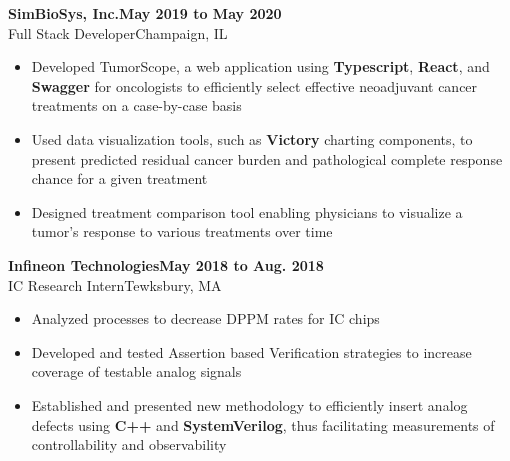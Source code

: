 \documentclass[9pt]{extarticle}
\newcommand{\experiencesubsection}[4]{
    \vspace{0.75em}\Large\textbf{#1\hfill{#4}}\\{#2}\hfill{#3}\normalsize
}
\begin{document}
\begin{minipage}[t]{.7\textwidth}
    \experiencesubsection{SimBioSys, Inc.}{Full Stack Developer}{Champaign, IL}{May 2019 to May 2020}
    \begin{itemize}
        \setlength\itemsep{1dd}
        \item Developed TumorScope, a web application using \textbf{Typescript}, \textbf{React}, and \textbf{Swagger} for oncologists to efficiently select
            effective neoadjuvant cancer treatments on a case-by-case basis
        \item Used data visualization tools, such as \textbf{Victory} charting components, to present predicted residual cancer burden and pathological
            complete response chance for a given treatment
        \item Designed treatment comparison tool enabling physicians to visualize a tumor's response to various treatments over time
    \end{itemize}

    \experiencesubsection{Infineon Technologies}{IC Research Intern}{Tewksbury, MA}{May 2018 to Aug. 2018}
    \begin{itemize}
        \setlength\itemsep{1dd}
        \item Analyzed processes to decrease DPPM rates for IC chips
        \item Developed and tested Assertion based Verification strategies to increase coverage of testable analog signals
        \item Established and presented new methodology to efficiently insert analog defects using \textbf{C++} and \textbf{SystemVerilog},
            thus facilitating measurements of controllability and observability 
    \end{itemize}

\end{minipage}
\end{document}
